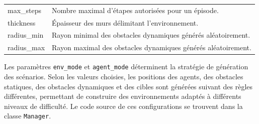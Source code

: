\begin{table}[h]
\begin{tabularx}{\textwidth}{>{\ttfamily\small}l X}
        max\_steps                      & Nombre maximal d'étapes autorisées pour un épisode.                                     \\

        thickness                       & Épaisseur des murs délimitant l'environnement.                                          \\

        radius\_min                     & Rayon minimal des obstacles dynamiques générés aléatoirement.                           \\

        radius\_max                     & Rayon maximal des obstacles dynamiques générés aléatoirement.                           \\
        \bottomrule
    \end{tabularx}
\end{table}

\noindent Les paramètres \texttt{env\_mode} et \texttt{agent\_mode} déterminent la stratégie de génération des scénarios. Selon les valeurs choisies, les positions des agents, des obstacles statiques, des obstacles dynamiques et des cibles sont générées suivant des règles différentes, permettant de construire des environnements adaptés à différents niveaux de difficulté. Le code source de ces configurations se trouvent dans la classe \texttt{Manager}.

